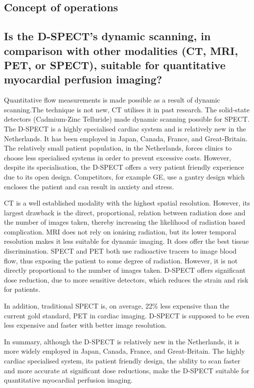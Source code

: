 \subsection{Concept of operations}
\label{sec:concept_oper}
\subsection*{Is the D-SPECT's dynamic scanning, in comparison with other modalities (CT, MRI, PET, or SPECT), suitable for quantitative myocardial perfusion imaging?}
Quantitative flow measurements is made possible as a result of dynamic scanning.The technique is not new, \ac{CT} utilises it in past research. The solid-state detectors (Cadmium-Zinc Telluride) made dynamic scanning possible for \ac{SPECT}. The D-SPECT is a highly specialised cardiac system and is relatively new in the Netherlands. It has been employed in Japan, Canada, France, and Great-Britain. The relatively small patient population, in the Netherlands, forces clinics to choose less specialised systems in order to prevent excessive costs. However, despite its specialisation, the D-SPECT offers a very patient friendly experience due to its open design. Competitors, for example GE, use a gantry design which encloses the patient and can result in anxiety and stress.

\ac{CT} is a well established modality with the highest spatial resolution. However, its largest drawback is the direct, proportional, relation between radiation dose and the number of images taken, thereby increasing the likelihood of radiation based complication. \ac{MRI} does not rely on ionising radiation, but its lower temporal resolution makes it less suitable for dynamic imaging. It does offer the best tissue discrimination. \ac{SPECT} and \ac{PET} both use radioactive tracers to image blood flow, thus exposing the patient to some degree of radiation. However, it is not directly proportional to the number of images taken. D-SPECT offers significant dose reduction, due to more sensitive detectors, which reduces the strain and risk for patients.

In addition, traditional \ac{SPECT} is, on average, 22\% less expensive than the current gold standard, \ac{PET} in cardiac imaging. D-SPECT is supposed to be even less expensive and faster with better image resolution. 

In summary, although the D-SPECT is relatively new in the Netherlands, it is more widely employed in Japan, Canada, France, and Great-Britain. The highly cardiac specialised system, its patient friendly design, the ability to scan faster and more accurate at significant dose reductions, make the D-SPECT suitable for quantitative myocardial perfusion imaging. 

